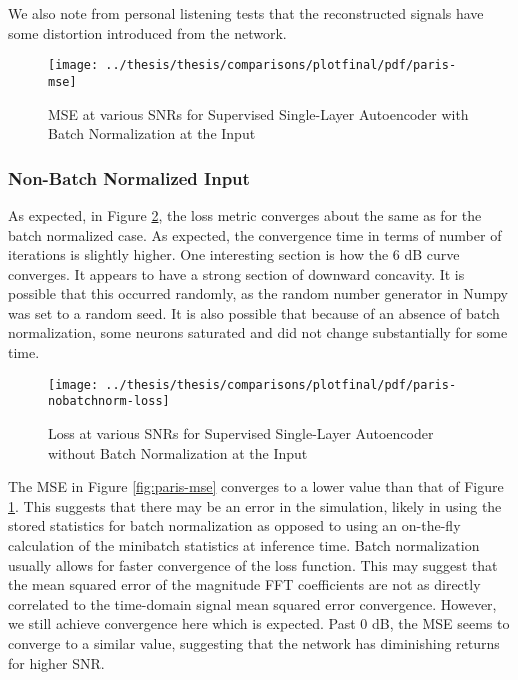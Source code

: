 We also note from personal listening tests that the reconstructed signals have some distortion introduced from the network.

\begin{figure}[!ht]
\centering
\texttt{[image: ../thesis/thesis/comparisons/plotfinal/pdf/paris-mse]}
\caption{MSE at various SNRs for Supervised Single-Layer Autoencoder with Batch Normalization at the Input}\label{fig:paris-bn-mse}
\end{figure}

\subsubsection{Non-Batch Normalized Input}

As expected, in Figure \ref{fig:paris-loss}, the loss metric converges about the same as for the batch normalized case. As expected, the convergence time in terms of number of iterations is slightly higher. One interesting section is how the 6 dB curve converges. It appears to have a strong section of downward concavity. It is possible that this occurred randomly, as the random number generator in Numpy was set to a random seed. It is also possible that because of an absence of batch normalization, some neurons saturated and did not change substantially for some time.

\begin{figure}[!ht]
\centering
\texttt{[image: ../thesis/thesis/comparisons/plotfinal/pdf/paris-nobatchnorm-loss]}
\caption{Loss at various SNRs for Supervised Single-Layer Autoencoder without Batch Normalization at the Input}\label{fig:paris-loss}
\end{figure}

The MSE in Figure \ref{fig:paris-mse} converges to a lower value than that of Figure \ref{fig:paris-bn-mse}. This suggests that there may be an error in the simulation, likely in using the stored statistics for batch normalization as opposed to using an on-the-fly calculation of the minibatch statistics at inference time. Batch normalization usually allows for faster convergence of the loss function. This may suggest that the mean squared error of the magnitude FFT coefficients are not as directly correlated to the time-domain signal mean squared error convergence. However, we still achieve convergence here which is expected. Past 0 dB, the MSE seems to converge to a similar value, suggesting that the network has diminishing returns for higher SNR.

